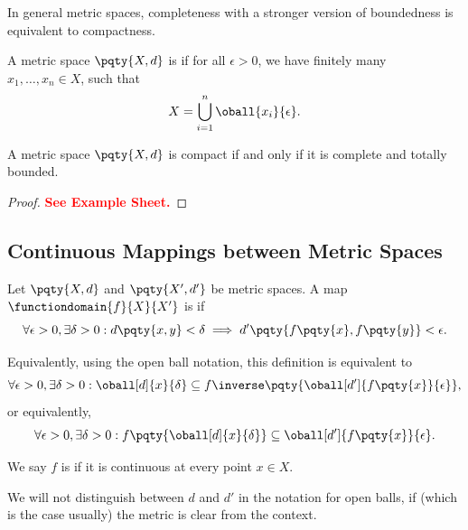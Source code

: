 In general metric spaces, completeness with a stronger version of boundedness is equivalent to compactness.

\begin{definition}
    \label{def:totally-bounded}%
    A metric space \(\pqty{X, d}\) is  if for all \(\epsilon > 0\), we have finitely many \(x_1, \ldots, x_n \in X\), such that
    \[
        X = \bigcup_{i = 1}^n \oball{x_i}{\epsilon}.
    \]
\end{definition}

\begin{theorem}
    \label{thm:compactness-equivalent-to-completeness-and-total-boundedness}%
    A metric space \(\pqty{X, d}\) is compact if and only if it is complete and totally bounded.
\end{theorem}

\begin{proof}
    \textbf{\textcolor{red}{See Example Sheet.}}
\end{proof}

\subsection{Continuous Mappings between Metric Spaces}

\begin{definition}
    \label{def:continuous-mappings-between-metric-spaces}%
    Let \(\pqty{X, d}\) and \(\pqty{X', d'}\) be metric spaces. A map \(\functiondomain{f}{X}{X'}\) is  if
    \[
        \forall \epsilon > 0, \exists \delta > 0: d\pqty{x, y} < \delta \implies d'\pqty{f\pqty{x}, f\pqty{y}} < \epsilon.
    \]

    Equivalently, using the open ball notation, this definition is equivalent to
    \[
        \forall \epsilon > 0, \exists \delta > 0: \oball[d]{x}{\delta} \subseteq f\inverse\pqty{\oball[d']{f\pqty{x}}{\epsilon}},
    \]
    or equivalently,
    \[
        \forall \epsilon > 0, \exists \delta > 0: f\pqty{\oball[d]{x}{\delta}} \subseteq \oball[d']{f\pqty{x}}{\epsilon}.
    \]

    We say \(f\) is  if it is continuous at every point \(x \in X\).
\end{definition}

We will not distinguish between \(d\) and \(d'\) in the notation for open balls, if (which is the case usually) the metric is clear from the context.

